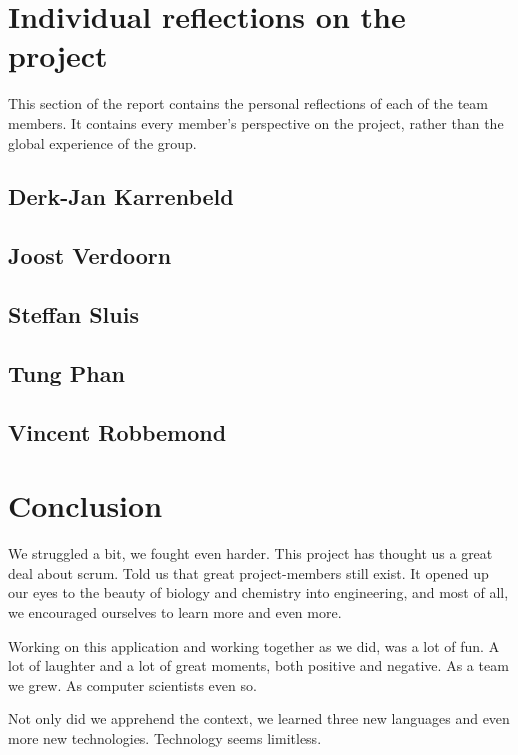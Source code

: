 \documentclass[10pt,a4paper]{report}
\begin{document}
	\section{Individual reflections on the project}
		This section of the report contains the personal reflections of each of the team members. It contains every member's perspective on the project, rather than the global experience of the group.
		\subsection{Derk-Jan Karrenbeld}
			
			\clearpage
		\subsection{Joost Verdoorn}
			
			\clearpage
		\subsection{Steffan Sluis}
			
			\clearpage
		\subsection{Tung Phan}
			
			\clearpage
		\subsection{Vincent Robbemond}
			
	
	\clearpage	
	\section{Conclusion}
		We struggled a bit, we fought even harder. This project has thought us a great deal about scrum. Told us that great project-members still exist. It opened up our eyes to the beauty of biology and chemistry into engineering, and most of all, we encouraged ourselves to learn more and even more.
		
		Working on this application and working together as we did, was a lot of fun. A lot of laughter and a lot of great moments, both positive and negative. As a team we grew. As computer scientists even so.
		
		Not only did we apprehend the context, we learned three new languages and even more new technologies. Technology seems limitless. 
	
\end{document}

